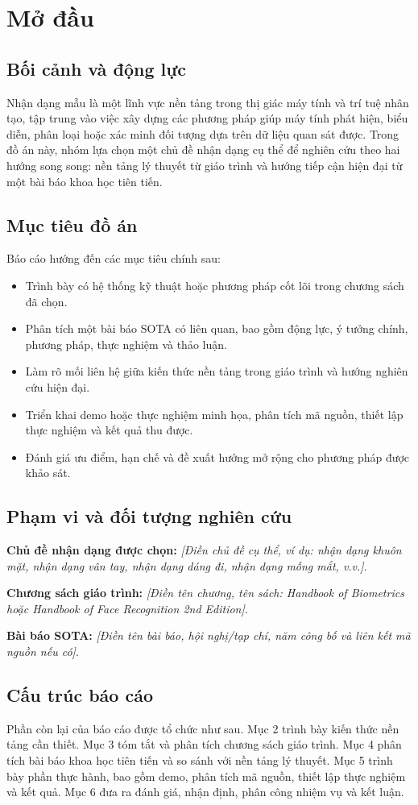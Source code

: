 \section{Mở đầu}

\subsection{Bối cảnh và động lực}
Nhận dạng mẫu là một lĩnh vực nền tảng trong thị giác máy tính và trí tuệ nhân tạo, tập trung vào việc xây dựng các phương pháp giúp máy tính phát hiện, biểu diễn, phân loại hoặc xác minh đối tượng dựa trên dữ liệu quan sát được. Trong đồ án này, nhóm lựa chọn một chủ đề nhận dạng cụ thể để nghiên cứu theo hai hướng song song: nền tảng lý thuyết từ giáo trình và hướng tiếp cận hiện đại từ một bài báo khoa học tiên tiến.

\subsection{Mục tiêu đồ án}
Báo cáo hướng đến các mục tiêu chính sau:
\begin{itemize}
    \item Trình bày có hệ thống kỹ thuật hoặc phương pháp cốt lõi trong chương sách đã chọn.
    \item Phân tích một bài báo SOTA có liên quan, bao gồm động lực, ý tưởng chính, phương pháp, thực nghiệm và thảo luận.
    \item Làm rõ mối liên hệ giữa kiến thức nền tảng trong giáo trình và hướng nghiên cứu hiện đại.
    \item Triển khai demo hoặc thực nghiệm minh họa, phân tích mã nguồn, thiết lập thực nghiệm và kết quả thu được.
    \item Đánh giá ưu điểm, hạn chế và đề xuất hướng mở rộng cho phương pháp được khảo sát.
\end{itemize}

\subsection{Phạm vi và đối tượng nghiên cứu}
\textbf{Chủ đề nhận dạng được chọn:} \textit{[Điền chủ đề cụ thể, ví dụ: nhận dạng khuôn mặt, nhận dạng vân tay, nhận dạng dáng đi, nhận dạng mống mắt, v.v.]}.

\textbf{Chương sách giáo trình:} \textit{[Điền tên chương, tên sách: Handbook of Biometrics hoặc Handbook of Face Recognition 2nd Edition]}.

\textbf{Bài báo SOTA:} \textit{[Điền tên bài báo, hội nghị/tạp chí, năm công bố và liên kết mã nguồn nếu có]}.

\subsection{Cấu trúc báo cáo}
Phần còn lại của báo cáo được tổ chức như sau. Mục 2 trình bày kiến thức nền tảng cần thiết. Mục 3 tóm tắt và phân tích chương sách giáo trình. Mục 4 phân tích bài báo khoa học tiên tiến và so sánh với nền tảng lý thuyết. Mục 5 trình bày phần thực hành, bao gồm demo, phân tích mã nguồn, thiết lập thực nghiệm và kết quả. Mục 6 đưa ra đánh giá, nhận định, phân công nhiệm vụ và kết luận.
